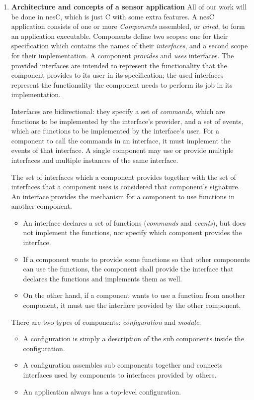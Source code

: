 \documentclass[letterpaper,12pt]{article}
\begin{document}
\begin{enumerate}
\item \textbf{Architecture and concepts of a sensor application}
    All of our work will be done in nesC, which is just C with some extra features.
    A nesC application consists of one or more \emph{Components} assembled, or \emph{wired},
    to form an application executable. Components define two scopes: one for
    their specification which contains the names of their \emph{interfaces},
    and a second scope for their implementation. A component \emph{provides} and \emph{uses}
    interfaces. The provided interfaces are intended to represent the
    functionality that the component provides to its user in its specification;
    the used interfaces represent the functionality the component needs to
    perform its job in its implementation.

    Interfaces are bidirectional: they specify a set of \emph{commands}, which are functions to be implemented by the interface's provider, and a set of events, which are functions to be implemented by the interface's user. For a component to call the commands in an interface, it must implement the events of that interface. A single component may use or provide multiple interfaces and multiple instances of the same interface.

The set of interfaces which a component provides together with the set of interfaces that a component uses is considered that component's signature. 
   An interface provides the mechanism for a component to use functions in another component.
   \begin{itemize}
      \item An interface declares a set of functions (\emph{commands} and \emph{events}), but does not implement the functions, nor specify which component provides the interface.
      \item If a component wants to provide some functions so that other components can use the functions, the component shall provide the interface that declares the functions and implements them as well.
      \item On the other hand, if a component wants to use a function from another component, it must use the interface provided by the other component.
   \end{itemize}

   There are two types of components: \emph{configuration} and \emph{module}.
   \begin{itemize}
      \item A configuration is simply a description of the sub components inside the configuration.
      \item A configuration assembles sub components together and connects interfaces used by components to interfaces provided by others.
      \item An application always has a top-level configuration.
   \end{itemize}


\end{enumerate}
\end{document}
